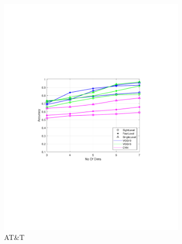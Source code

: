 \setcounter{figure}{3}	
\begin{figure}[ht!]
	\begin{subfigure}{.33\textwidth}
		\includegraphics[width=\linewidth, trim=3.8cm 8cm 4cm 8cm, clip=true]{figures/att_acc}
		\captionsetup{justification=centering}
		\caption{ AT\&T}
		\label{fig:att_acc}
	\end{subfigure}
	\begin{subfigure}{.33\textwidth}

\end{subfigure}
\end{figure}

